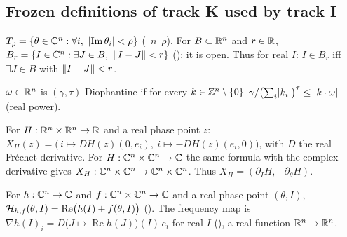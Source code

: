\subsection{Frozen definitions of track K used by track I}\label{bpI:p0:kdefs}

\begin{definition}\label{bpI:p0:domains}
$T_\rho=\{\theta\in\C^n:\forall i,\ \abs{\operatorname{Im}\theta_i}<\rho\}$ (\ $n$\ $\rho$).
For $B\subset\mathbb{R}^n$ and $r\in\mathbb{R}$, $B_r=\{I\in\C^n:\exists J\in B,\ \norm{I-J}<r\}$ (); it is open.
Thus for real $I$: $I\in B_r$ iff $\exists J\in B$ with $\lVert I-J\rVert<r$.
\end{definition}

\begin{definition}\label{bpI:p0:diophantine}
$\omega\in\mathbb{R}^n$ is $(\gamma,\tau)$-Diophantine if for every $k\in\mathbb{Z}^n\setminus\{0\}$
$\gamma/\bigl(\sum_i\lvert k_i\rvert\bigr)^{\tau}\le\lvert k\cdot\omega\rvert$ (real power).
\end{definition}

\begin{definition}\label{bpI:p0:hamiltonian}
For $H:\mathbb{R}^n\times\mathbb{R}^n\to\mathbb{R}$ and a real phase point $z$:
$X_H(z)=\bigl(\,i\mapsto D H(z)(0,e_i),\ i\mapsto -DH(z)(e_i,0)\bigr)$, with $D$ the real Fr\'echet derivative.
For $H:\mathbb{C}^n\times\mathbb{C}^n\to\mathbb{C}$ the same formula with the complex derivative gives $X_H:\mathbb{C}^n\times\mathbb{C}^n\to
\mathbb{C}^n\times\mathbb{C}^n$. Thus $X_H=(\partial_IH,-\partial_\theta H)$.
\end{definition}

\begin{definition}\label{bpI:p0:realham}
For $h:\mathbb{C}^n\to\mathbb{C}$ and $f:\mathbb{C}^n\times\mathbb{C}^n\to\mathbb{C}$ and a real phase point $(\theta,I)$,
$\mathcal H_{h,f}(\theta,I)=\operatorname{Re}\bigl(h(I)+f(\theta,I)\bigr)$ (). The frequency map is
$\nabla h(I)_i=D\bigl(J\mapsto\operatorname{Re}h(J)\bigr)(I)\,e_i$ for real $I$ (), a real function
$\mathbb{R}^n\to\mathbb{R}^n$.
\end{definition}

